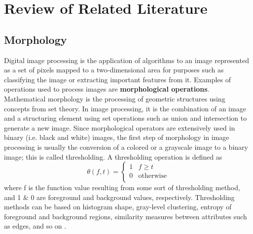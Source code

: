 \documentclass[conference,compsoc]{IEEEtran}
\begin{document}
%
%


\section{Review of Related Literature}
\subsection{Morphology}
Digital image processing is the application of algorithms to an image represented as a set of pixels mapped to a two-dimensional area for purposes such as classifying the image or extracting important features from it. Examples of operations used to process images are \textbf{morphological operations}. Mathematical morphology \cite{serra83} is the processing of geometric structures using concepts from set theory. In image processing, it is the combination of an image and a structuring element using set operations such as union and intersection to generate a new image. Since morphological operators are extensively used in binary (i.e. black and white) images, the first step of morphology in image processing is usually the conversion of a colored or a grayscale image to a binary image; this is called thresholding. A thresholding operation is defined as
\[ \theta(f,t) = 
   \begin{cases} 
    1 & f\geq t \\
    0 & \text{otherwise} \\
   \end{cases}
\]
where f is the function value resulting from some sort of thresholding method, and 1 \& 0 are foreground and background values, respectively. Thresholding methods can be based on histogram shape, gray-level clustering, entropy of foreground and background regions, similarity measures between attributes such as edges, and so on \cite{sezgin04}.\\
\end{document}
